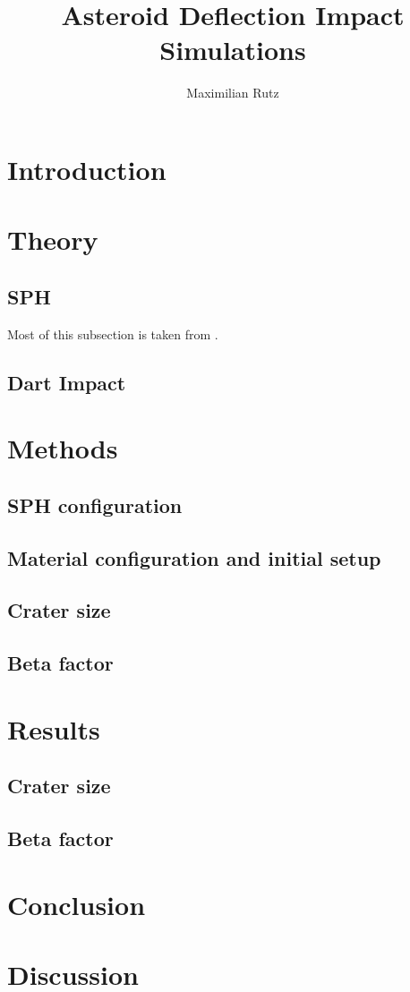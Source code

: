 \documentclass{article}
\title{Asteroid Deflection Impact Simulations}
\author{Maximilian Rutz}
\date{}
\begin{document}
	\maketitle
	\begin{abstract}
	 
	\end{abstract}
	
	\newpage
	\tableofcontents
	 
	\newpage
	\section{Introduction} 
	\section{Theory}
		\subsection{SPH}
			Most of this subsection is taken from \cite{Jutzi_p_alpha_1}.	
		\subsection{Dart Impact}
	\section{Methods}
		\subsection{SPH configuration}
		\subsection{Material configuration and initial setup}
		\subsection{Crater size}
		\subsection{Beta factor}

	\section{Results}
		\subsection{Crater size}
		\subsection{Beta factor}
	\section{Conclusion}
	\section{Discussion}
	
	\newpage 
	\printbibliography
 
\end{document}
